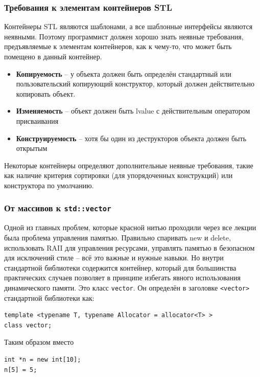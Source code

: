 \documentclass[a4paper,12pt,oneside]{article}
\begin{document}
\subsubsection{Требования к элементам контейнеров STL}

Контейнеры STL являются шаблонами, а все шаблонные интерфейсы являются неявными. Поэтому программист должен хорошо знать неявные требования, предъявляемые к элементам контейнеров, как к чему-то, что может быть помещено в данный контейнер.

\begin{itemize}
\item \textbf{Копируемость} -- у объекта должен быть определён стандартный или пользовательский копирующий конструктор, который должен действительно копировать объект.
\item \textbf{Изменяемость} -- объект должен быть lvalue с действительным оператором присваивания
\item \textbf{Конструируемость} -- хотя бы один из деструкторов объекта должен быть открытым
\end{itemize}

Некоторые контейнеры определяют дополнительные неявные требования, такие как наличие критерия сортировки (для упорядоченных конструкций) или конструктора по умолчанию.

\subsubsection{От массивов к \lstinline!std::vector!}

Одной из главных проблем, которые красной нитью проходили через все лекции была проблема управления памятью. Правильно спаривать new и delete, использовать RAII для управления ресурсами, управлять памятью в безопасном для исключений стиле -- всё это важные и нужные навыки. Но внутри стандартной библиотеки содержится контейнер, который для большинства практических случаев позволяет в принципе избегать явного использования динамического памяти. Это класс \lstinline!vector!. Он определён в заголовке \lstinline!<vector>! стандартной библиотеки как:

\begin{lstlisting}
template <typename T, typename Allocator = allocator<T> >
class vector;
\end{lstlisting}

Таким образом вместо

\begin{lstlisting}
int *n = new int[10];
n[5] = 5;
\end{lstlisting}
\end{document}
